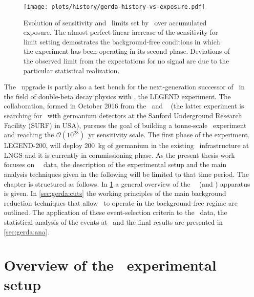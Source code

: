 \begin{figure}
  \centering
  \texttt{[image: plots/history/gerda-history-vs-exposure.pdf]}
  \caption{%
    Evolution of sensitivity and \thalfzero\ limits set by \gerda\ over accumulated
    exposure. The almost perfect linear increase of the sensitivity for limit setting
    demostrates the background-free conditions in which the experiment has been operating
    in its second phase. Deviations of the observed limit from the expectations for no
    signal are due to the particular statistical realization.
  }\label{img:exp:gerda-history}
\end{figure}
\newpar
The \phasetwop\ upgrade is partly also a test bench for the next-generation successor of
\gerda\ in the field of double-beta decay physics with \gesix, the LEGEND experiment. The
collaboration, formed in October 2016 from the \gerda\ and \majorana~\cite{Abgrall2014}
(the latter experiment is searching for \onbb\ with germanium detectors at the Sanford
Underground Research Facility (SURF) in USA), pursues the goal of building a tonne-scale
\gesix\ experiment and reaching the $\mathcal{O}(10^{28})$~yr sensitivity scale. The first
phase of the experiment, LEGEND-200, will deploy 200~kg of germanium in the existing \gerda\
infrastructure at LNGS and it is currently in commissioning phase.
\newpar
As the present thesis work focuses on \gerda\ \phasetwo\ data, the description of the
experimental setup and the main analysis techniques given in the following will be limited
to that time period. The chapter is structured as follows. In \cref{sec:gerda:setup} a
general overview of the \gerda\ \phasetwo\ (and \phasetwop) apparatus is given. In
\cref{sec:gerda:cuts} the working principles of the main background reduction techniques
that allow \gerda\ to operate in the background-free regime are outlined. The application
of these event-selection criteria to the \phasetwo\ data, the statistical analysis of the
events at \qbb\ and the final results are presented in \cref{sec:gerda:ana}.

\section{Overview of the \phasetwo\ experimental setup}%
\label{sec:gerda:setup}

